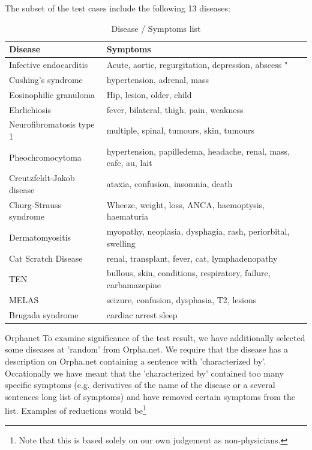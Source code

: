 The subset of the \cite{HangwiTang11102006} test cases include the
following 13 diseases:

\begin{table}[!h]
\caption{Disease / Symptoms list}
\begin{tabular}{|l|p{7cm}|}
\hline
Disease & Symptoms \\
\hline
Infective endocarditis & Acute, aortic,  regurgitation, depression,  abscess " \\
\hline
Cushing's syndrome & hypertension, adrenal, mass \\
\hline
Eosinophilic granuloma & Hip, lesion, older, child \\
\hline
Ehrlichiosis & fever, bilateral, thigh, pain, weakness \\
\hline
Neurofibromatosis type 1 & multiple, spinal, tumours, skin, tumours \\
\hline
Pheochromocytoma & hypertension, papilledema, headache, renal, mass, cafe, au, lait \\
\hline
Creutzfeldt-Jakob disease & ataxia, confusion, insomnia, death \\
\hline
Churg-Strauss syndrome & Wheeze, weight, loss, ANCA, haemoptysis, haematuria \\
\hline
Dermatomyositis & myopathy, neoplasia, dysphagia, rash, periorbital, swelling \\
\hline
Cat Scratch Disease & renal, transplant, fever, cat, lymphadenopathy \\
\hline
TEN & bullous, skin, conditions, respiratory, failure, carbamazepine \\
\hline
MELAS & seizure, confusion, dysphasia, T2, lesions \\
\hline
Brugada syndrome & cardiac arrest sleep \\
\hline
\end{tabular}
\end{table}

Orphanet
To examine significance of the test result, we have additionally selected some diseases at 'random' from Orpha.net. We require that the disease has a description on Orpha.net containing a sentence with 'characterized by'. Occationally we have meant that the 'characterized by' contained too many specific symptoms (e.g. derivatives of the name of the disease or a several sentences long list of symptoms) and have removed certain symptoms from the list. Examples of reductions would be\footnote{Note that this is based solely on our own judgement as non-physicians.} \\

